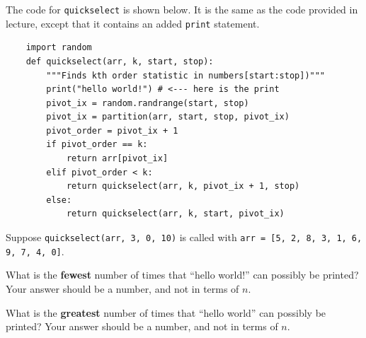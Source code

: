 \begin{prob}
    The code for \texttt{quickselect} is shown below. It is the same
    as the code provided in lecture, except that it contains an added
    \texttt{print} statement.

    \begin{verbatim}
    import random 
    def quickselect(arr, k, start, stop):
        """Finds kth order statistic in numbers[start:stop])"""
        print("hello world!") # <--- here is the print
        pivot_ix = random.randrange(start, stop)
        pivot_ix = partition(arr, start, stop, pivot_ix)
        pivot_order = pivot_ix + 1
        if pivot_order == k:
            return arr[pivot_ix]
        elif pivot_order < k:
            return quickselect(arr, k, pivot_ix + 1, stop)
        else:
            return quickselect(arr, k, start, pivot_ix)
    \end{verbatim}

    Suppose \texttt{quickselect(arr, 3, 0, 10)} is called with
    \texttt{arr = [5, 2, 8, 3, 1, 6, 9, 7, 4, 0]}.

    \begin{subprobset}

        \begin{subprob}
            What is the \textbf{fewest} number of times that ``hello world!'' can possibly be printed?
            Your answer should be a number, and not in terms of $n$.

        \end{subprob}

        \begin{subprob}
            What is the \textbf{greatest} number of times that ``hello world'' can possibly be printed?
            Your answer should be a number, and not in terms of $n$.

        \end{subprob}
    \end{subprobset}
\end{prob}
